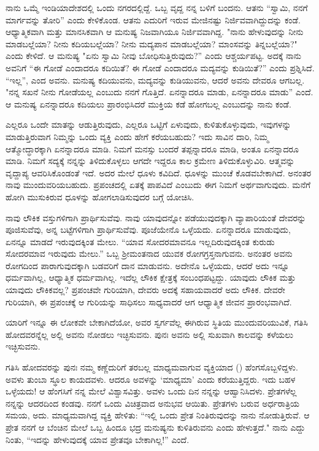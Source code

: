 ನಾನು ಒಮ್ಮೆ ಇಂಡಿಯಾದೇಶದಲ್ಲಿ ಒಂದು ನಗರದಲ್ಲಿದ್ದೆ. ಒಬ್ಬ ವೃದ್ದ ನನ್ನ ಬಳಿಗೆ ಬಂದನು. ಆತನು “ಸ್ವಾಮಿ, ನನಗೆ ಮಾರ್ಗವನ್ನು ತೋರಿ” ಎಂದು ಕೇಳಿಕೊಂಡ. ಆತನು ಎದುರಿಗೆ ಇರುವ ಮೇಜಿನಷ್ಟು ನಿರ್ಜಿವವಾಗಿದ್ದುದನ್ನು ಕಂಡೆ. ಆಧ್ಯಾತ್ಮಿಕವಾಗಿ ಮತ್ತು ಮಾನಸಿಕವಾಗಿ ಆ ಮನುಷ್ಯ ನಿಜವಾಗಿಯೂ ನಿರ್ಜಿವವಾಗಿದ್ದ. "ನಾನು ಹೇಳುವುದನ್ನು ನೀನು ಮಾಡಬಲ್ಲೆಯಾ? ನೀನು ಕದಿಯಬಲ್ಲೆಯಾ? ನೀನು ಮದ್ಯಪಾನ ಮಾಡಬಲ್ಲೆಯಾ? ಮಾಂಸವನ್ನು ತಿನ್ನಬಲ್ಲೆಯಾ?" ಎಂದು ಕೇಳಿದೆ. ಆ ಮನುಷ್ಯ "ಏನು ಸ್ವಾಮಿ ನೀವು ಬೋಧಿಸುತ್ತಿರುವುದು?” ಎಂದು ಆಶ್ಚರ್ಯಪಟ್ಟ. ಅದಕ್ಕೆ ನಾನು ಅವನಿಗೆ “ಈ ಗೋಡೆ ಎಂದಾದರೂ ಕದಿಯಿತೆ? ಈ ಗೋಡೆ ಎಂದಾದರೂ ಮದ್ಯವನ್ನು ಕುಡಿಯಿತೆ?'' ಎಂದು ಪ್ರಶ್ನಿಸಿದೆ. “ಇಲ್ಲ”, ಎಂದ ಅವನು. ಮನುಷ್ಯ ಕದಿಯುವನು, ಮದ್ಯವನ್ನು ಕುಡಿಯುವನು, ಆದರೆ ಅವನು ದೇವರೂ ಆಗಬಲ್ಲ. "ನನ್ನ ಸಖನೆ ನೀನು ಗೋಡೆಯಲ್ಲ ಎಂಬುದು ನನಗೆ ಗೊತ್ತಿದೆ. ಏನನ್ನಾದರೂ ಮಾಡು, ಏನನ್ನಾದರೂ ಮಾಡು'' ಎಂದೆ. ಆ ಮನುಷ್ಯ ಏನನ್ನಾದರೂ ಕದಿಯಲು ಪ್ರಾರಂಭಿಸಿದರೆ ಮುಕ್ತಿಯ ಕಡೆ ಹೋಗಬಲ್ಲ ಎಂಬುದನ್ನು ನಾನು ಕಂಡೆ.

ಎಲ್ಲರೂ ಒಂದೇ ಮಾತನ್ನು ಆಡುತ್ತಿರುವುದು, ಎಲ್ಲರೂ ಒಟ್ಟಿಗೆ ಏಳುವುದು, ಕುಳಿತುಕೊಳ್ಳುವುದು, ಇವುಗಳನ್ನು ಮಾಡುತ್ತಿರುವಾಗ ನಿಮ್ಮನ್ನು ಒಂದು ವ್ಯಕ್ತಿ ಎಂದು ಹೇಗೆ ಕರೆಯಬಹುದು? ಇದು ಸಾವಿನ ದಾರಿ, ನಿಮ್ಮ ಆತ್ಮೋದ್ಧಾರಕ್ಕಾಗಿ ಏನನ್ನಾದರೂ ಮಾಡಿ. ನಿಮಗೆ ಮನಸ್ಸು ಬಂದರೆ ತಪ್ಪನ್ನಾದರೂ ಮಾಡಿ, ಅಂತೂ ಏನನ್ನಾದರೂ ಮಾಡಿ. ನಿಮಗೆ ಸದ್ಯಕ್ಕೆ ನನ್ನನ್ನು ತಿಳಿದುಕೊಳ್ಳಲು ಆಗದೇ ಇದ್ದರೂ ಕಾಲ ಕ್ರಮೇಣ ತಿಳಿದುಕೊಳ್ಳುವಿರಿ. ಆತ್ಮವನ್ನು ವೃದ್ದಾಪ್ಯ ಆವರಿಸಿಕೊಂಡಂತೆ ಇದೆ. ಅದರ ಮೇಲೆ ಧೂಳು ಕವಿದಿದೆ. ಧೂಳನ್ನು ಮುಂಚೆ ಕೊಡವಬೇಕಾಗಿದೆ. ಅನಂತರ ನಾವು ಮುಂದುವರಿಯಬಹುದು. ಪ್ರಪಂಚದಲ್ಲಿ ಏತಕ್ಕೆ ಪಾಪವಿದೆ ಎಂಬುದು ಈಗ ನಿಮಗೆ ಅರ್ಥವಾಗುವುದು. ಮನೆಗೆ ಹೋಗಿ ಮುಸುಕಿರುವ ಧೂಳನ್ನು ಹೋಗಲಾಡಿಸುವುದರ ಬಗ್ಗೆ ಯೋಚಿಸಿ.

ನಾವು ಲೌಕಿಕ ವಸ್ತುಗಳಿಗಾಗಿ ಪ್ರಾರ್ಥಿಸುವೆವು. ನಾವು ಯಾವುದನ್ನೋ ಪಡೆಯುವುದಕ್ಕಾಗಿ ವ್ಯಾಪಾರಿಯಂತೆ ದೇವರನ್ನು ಪೂಜಿಸುವೆವು, ಅನ್ನ ಬಟ್ಟೆಗಳಿಗಾಗಿ ಪ್ರಾರ್ಥಿಸುವೆವು. ಪೂಜೆಯೇನೊ ಒಳ್ಳೆಯದು. ಏನನ್ನಾದರೂ ಮಾಡುವುದು, ಏನನ್ನೂ ಮಾಡದೆ ಇರುವುದಕ್ಕಿಂತ ಮೇಲು. “ಯಾವ ಸೋದರಮಾವನೂ ಇಲ್ಲದಿರುವುದಕ್ಕಿಂತ ಕುರುಡು ಸೋದರಮಾವ ಇರುವುದು ಮೇಲು.” ಒಬ್ಬ ಶ‍್ರೀಮಂತನಾದ ಯುವಕ ರೋಗಗ್ರಸ್ತನಾಗುವನು. ಅನಂತರ ಅವನು ರೋಗದಿಂದ ಪಾರಾಗುವುದಕ್ಕಾಗಿ ಬಡವರಿಗೆ ದಾನ ಮಾಡುವನು. ಅದೇನೊ ಒಳ್ಳೆಯದು, ಆದರೆ ಅದು ಇನ್ನೂ ಧರ್ಮವಾಗಿಲ್ಲ, ಆಧ್ಯಾತ್ಮಿಕ ಧರ್ಮವಾಗಿಲ್ಲ. ಇದೆಲ್ಲ ಲೌಕಿಕ ಕ್ಷೇತ್ರಕ್ಕೆ ಸಂಬಂಧಪಟ್ಟದ್ದು. ಯಾವುದು ಲೌಕಿಕ ಮತ್ತು ಯಾವುದು ಲೌಕಿಕವಲ್ಲ? ಪ್ರಪಂಚವೇ ಗುರಿಯಾಗಿ, ದೇವರು ಅದಕ್ಕೆ ಸಹಾಯವಾದರೆ ಅದು ಲೌಕಿಕ. ದೇವರೇ ಗುರಿಯಾಗಿ, ಈ ಪ್ರಪಂಚಕ್ಕೆ ಆ ಗುರಿಯನ್ನು ಸಾಧಿಸಲು ಸಾಧ್ಯವಾದರೆ ಆಗ ಆಧ್ಯಾತ್ಮಿಕ ಜೀವನ ಪ್ರಾರಂಭವಾಗಿದೆ.

ಯಾರಿಗೆ ಇನ್ನೂ ಈ ಲೋಕವೇ ಬೇಕಾಗಿದೆಯೋ, ಅವರ ಸ್ವರ್ಗವೆಲ್ಲ ಈಗಿರುವ ಸ್ಥಿತಿಯ ಮುಂದುವರಿಯುವಿಕೆ, ಗತಿಸಿ ಹೋದವರನ್ನೆಲ್ಲ ಅಲ್ಲಿ ಅವನು ನೋಡಲು ಇಚ್ಛಿಸುವನು. ಪುನಃ ಅವನು ಅಲ್ಲಿ ಸುಖವಾಗಿ ಕಾಲವನ್ನು ಕಳೆಯಲು ಇಚ್ಛಿಸುವನು.

ಗತಿಸಿ ಹೋದವರನ್ನು ಪುನಃ ನಮ್ಮ ಕಣ್ಣೆದುರಿಗೆ ತರಬಲ್ಲ ಮಾಧ್ಯಮವಾಗುವ ವ್ಯಕ್ತಿಯಾದ () ಹೆಂಗಸೊಬ್ಬಳಿದ್ದಳು. ಅವಳು ತುಂಬಾ ಸ್ಥೂಲ ಕಾಯದವಳು. ಆದರೂ ಅವಳನ್ನು `ಮಾಧ್ಯಮಾ' ಎಂದು ಕರೆಯುತ್ತಿದ್ದರು. ಇದು ಬಹಳ ಒಳ್ಳೆಯದು! ಆ ಹೆಂಗಸಿಗೆ ನನ್ನ ಮೇಲೆ ವಿಶ್ವಾಸವಿತ್ತು. ಅವಳು ಒಂದು ದಿನ ನನ್ನನ್ನು ಆಹ್ವಾನಿಸಿದಳು. ಪ್ರೇತಗಳೆಲ್ಲ ನನ್ನನ್ನು ಆದರದಿಂದ ಕಂಡವು. ನನಗೆ ಒಂದು ವಿಚಿತ್ರವಾದ ಅನುಭವ ಆಯಿತು. ಪ್ರೇತಗಳು ಬರುವ ಅರ್ಧರಾತ್ರಿಯ ಸಮಯ, ಅದು. ಮಾಧ್ಯಮವಾಗಿದ್ದ ವ್ಯಕ್ತಿ ಹೇಳಿತು: “ಇಲ್ಲಿ ಒಂದು ಪ್ರೇತ ನಿಂತಿರುವುದನ್ನು ನಾನು ನೋಡುತ್ತಿರುವೆ. ಆ ಪ್ರೇತ ನನಗೆ ಆ ಬೆಂಚಿನ ಮೇಲೆ ಒಬ್ಬ ಹಿಂದೂ ಭದ್ರ ಮನುಷ್ಯನು ಕುಳಿತಿರುವನು ಎಂದು ಹೇಳುತ್ತದೆ." ನಾನು ಎದ್ದು ನಿಂತು, “ಇದನ್ನು ಹೇಳುವುದಕ್ಕೆ ಯಾವ ಪ್ರೇತವೂ ಬೇಕಾಗಿಲ್ಲ!” ಎಂದೆ.

